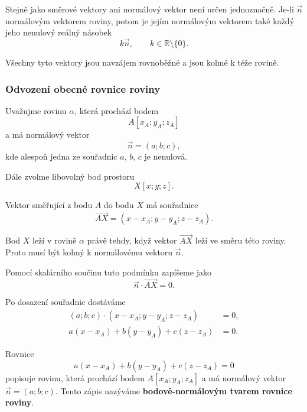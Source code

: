 Stejně jako směrové vektory ani normálový vektor není určen jednoznačně.
Je-li $\vec{n}$ normálovým vektorem roviny, potom je jejím normálovým
vektorem také každý jeho nenulový reálný násobek
\[
    k\vec{n},
    \qquad
    k\in\mathbb{R}\setminus\{0\}.
\]

Všechny tyto vektory jsou navzájem rovnoběžné a jsou kolmé k téže rovině.


\subsubsection{Odvození obecné rovnice roviny}
\label{subsubsec:Derivation_general_plane_equation}

Uvažujme rovinu $\alpha$, která prochází bodem
\[
    A[x_A;y_A;z_A]
\]
a má normálový vektor
\[
    \vec{n}=(a;b;c),
\]
kde alespoň jedna ze souřadnic $a$, $b$, $c$ je nenulová.

Dále zvolme libovolný bod prostoru
\[
    X[x;y;z].
\]

Vektor směřující z bodu $A$ do bodu $X$ má souřadnice
\[
    \overrightarrow{AX}
    =
    (x-x_A;y-y_A;z-z_A).
\]

Bod $X$ leží v rovině $\alpha$ právě tehdy, když vektor
$\overrightarrow{AX}$ leží ve směru této roviny. Proto musí být kolmý
k normálovému vektoru $\vec{n}$.

Pomocí skalárního součinu tuto podmínku zapíšeme jako
\begin{equation}
    \vec{n}\cdot\overrightarrow{AX}=0.
    \label{eq:Point_normal_condition_plane}
\end{equation}

Po dosazení souřadnic dostáváme
\begin{align*}
    (a;b;c)\cdot(x-x_A;y-y_A;z-z_A)&=0,\\
    a(x-x_A)+b(y-y_A)+c(z-z_A)&=0.
\end{align*}

Rovnice
\begin{equation}
    a(x-x_A)+b(y-y_A)+c(z-z_A)=0
    \label{eq:Point_normal_plane_equation}
\end{equation}
popisuje rovinu, která prochází bodem $A[x_A;y_A;z_A]$ a má normálový
vektor $\vec{n}=(a;b;c)$. Tento zápis nazýváme
\textbf{bodově-normálovým tvarem rovnice roviny}.


